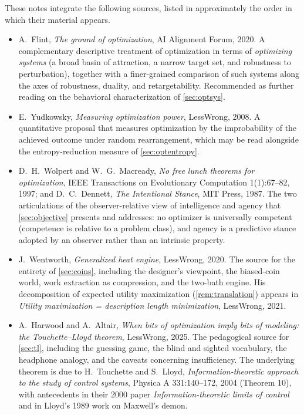 \documentclass[11pt]{article}
\begin{document}
These notes integrate the following sources, listed in approximately the order in which their material appears.

\begin{itemize}[leftmargin=2em]
  \item A.~Flint, \emph{The ground of optimization}, AI Alignment Forum, 2020. A complementary descriptive treatment of optimization in terms of \emph{optimizing systems} (a broad basin of attraction, a narrow target set, and robustness to perturbation), together with a finer-grained comparison of such systems along the axes of robustness, duality, and retargetability. Recommended as further reading on the behavioral characterization of \cref{sec:optsys}.
  \item E.~Yudkowsky, \emph{Measuring optimization power}, LessWrong, 2008. A quantitative proposal that measures optimization by the improbability of the achieved outcome under random rearrangement, which may be read alongside the entropy-reduction measure of \cref{sec:optentropy}.
  \item D.~H.~Wolpert and W.~G.~Macready, \emph{No free lunch theorems for optimization}, IEEE Transactions on Evolutionary Computation 1(1):67--82, 1997; and D.~C.~Dennett, \emph{The Intentional Stance}, MIT Press, 1987. The two articulations of the observer-relative view of intelligence and agency that \cref{sec:objective} presents and addresses: no optimizer is universally competent (competence is relative to a problem class), and agency is a predictive stance adopted by an observer rather than an intrinsic property.
  \item J.~Wentworth, \emph{Generalized heat engine}, LessWrong, 2020. The source for the entirety of \cref{sec:coins}, including the designer's viewpoint, the biased-coin world, work extraction as compression, and the two-bath engine. His decomposition of expected utility maximization (\cref{rem:translation}) appears in \emph{Utility maximization = description length minimization}, LessWrong, 2021.
  \item A.~Harwood and A.~Altair, \emph{When bits of optimization imply bits of modeling: the Touchette--Lloyd theorem}, LessWrong, 2025. The pedagogical source for \cref{sec:tl}, including the guessing game, the blind and sighted vocabulary, the headphone analogy, and the caveats concerning insufficiency. The underlying theorem is due to H.~Touchette and S.~Lloyd, \emph{Information-theoretic approach to the study of control systems}, Physica A 331:140--172, 2004 (Theorem 10), with antecedents in their 2000 paper \emph{Information-theoretic limits of control} and in Lloyd's 1989 work on Maxwell's demon.

\end{itemize}
\end{document}
